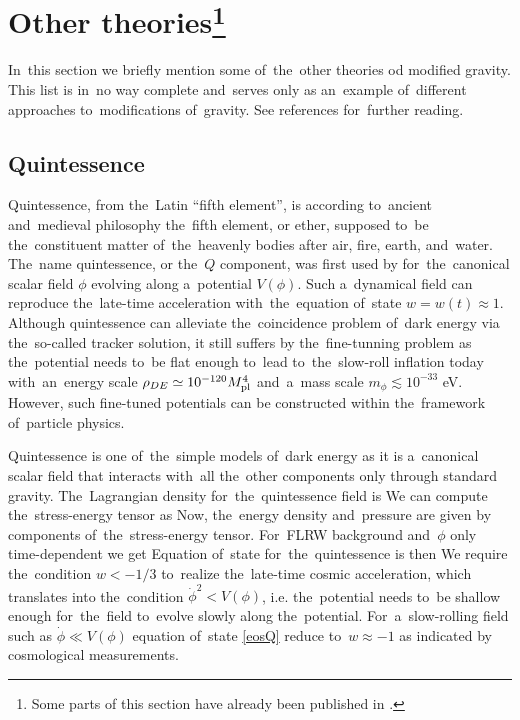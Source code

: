 \section[Other theories]{Other theories\footnote{Some parts of this section have already been published in \textcite{mastersthesis_vrastil}.}}
\label{sec:other}
In~this section we briefly mention some of~the~other theories od modified gravity. This list is in~no way complete and~serves only as an~example of~different approaches to~modifications of~gravity. See references for~further reading.
\subsection{Quintessence}
Quintessence, from the~Latin ``fifth element'', is according to~ancient and~medieval philosophy the~fifth element, or ether, supposed to~be the~constituent matter of~the~heavenly bodies after air, fire, earth, and~water. The~name quintessence, or the~$Q$ component, was first used by \textcite{1998PhRvL..80.1582C} for~the~canonical scalar field $\phi$ evolving along a~potential $V(\phi)$. Such a~dynamical field can reproduce the~late-time acceleration with~the~equation of~state $w=w(t)\approx1$. Although quintessence can alleviate the~coincidence problem of~dark energy via the~so-called tracker solution, it still suffers by the~fine-tunning problem as the~potential needs to~be flat enough to~lead to~the~slow-roll inflation today with~an~energy scale $\rho_{DE}\simeq10^{-120}M_{\text{\scriptsize pl}}^4$ and~a~mass scale $m_\phi\lesssim10^{-33}$ eV. However, such fine-tuned potentials can be constructed within the~framework of~particle physics.

Quintessence is one of~the~simple models of~dark energy as it is a~canonical scalar field that interacts with~all the~other components only through standard gravity. The~Lagrangian density for~the~quintessence field is
We can compute the~stress-energy tensor as
Now, the~energy density and~pressure are given by components of~the~stress-energy tensor. For~FLRW background and~$\phi$ only time-dependent we get
Equation of~state for~the~quintessence is then
We require the~condition $w<-1/3$ to~realize the~late-time cosmic acceleration, which translates into the~condition  $\dot{\phi}^2<V(\phi)$, i.e. the~potential needs to~be shallow enough for~the~field to~evolve slowly along the~potential. For~a~slow-rolling field such as $\dot{\phi}\ll V(\phi)$ equation of~state \eqref{eosQ} reduce to~$w\approx-1$ as indicated by cosmological measurements.

